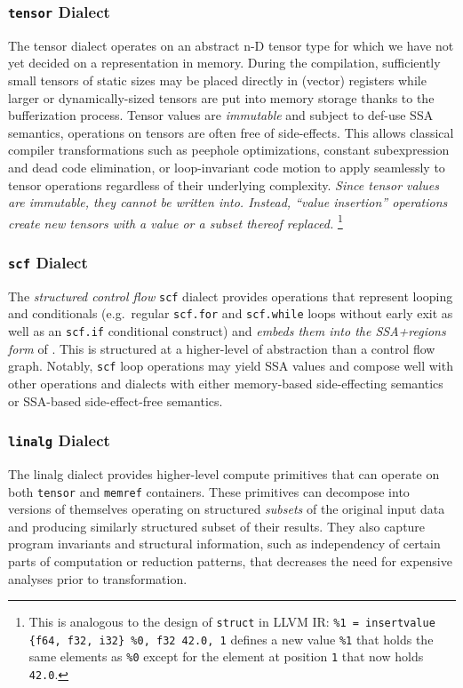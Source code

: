 \subsubsection{\lstinline|tensor| Dialect}
\label{subsubsec:tensor-dialect}
The tensor dialect operates on an abstract n-D tensor type for which we have not yet decided on a representation in memory. 
During the compilation, sufficiently small tensors of static sizes may be placed directly in (vector) registers while larger or dynamically-sized tensors are put into memory storage thanks to the bufferization process.
Tensor values are \emph{immutable} and subject to def-use SSA semantics, operations on tensors are often free of side-effects.
This allows classical compiler transformations such as peephole optimizations, constant subexpression and dead code elimination, or loop-invariant code motion to apply seamlessly to tensor operations regardless of their underlying complexity.
\emph{Since tensor values are immutable, they cannot be written into. Instead, ``value insertion'' operations create new tensors with a value or a subset thereof replaced.}
\footnote{This is analogous to the design of \texttt{struct} in LLVM IR:
\texttt{\%1 = insertvalue \{f64, f32, i32\} \%0, f32 42.0, 1} defines a new value \texttt{\%1} that holds the same elements as \texttt{\%0} except for the element at position \texttt{1} that now holds \texttt{42.0}.
}

\subsubsection{\lstinline|scf| Dialect}
The \emph{structured control flow} \lstinline|scf| dialect provides operations that represent looping and conditionals (e.g.\ regular \lstinline|scf.for| and \lstinline|scf.while| loops without early exit as well as an \lstinline|scf.if| conditional construct) and \emph{embeds them into the SSA+regions form} of \MLIR.
This is structured at a higher-level of abstraction than a control flow graph. Notably, \lstinline|scf| loop operations may yield SSA values and compose well with other operations and dialects with either memory-based side-effecting semantics or SSA-based side-effect-free semantics.

\subsubsection{\lstinline|linalg| Dialect}
The linalg dialect provides higher-level compute primitives that can operate on both \lstinline|tensor| and \lstinline|memref| containers. These primitives can decompose into versions of themselves operating on structured \emph{subsets} of the original input data and producing similarly structured subset of their results. They also capture program invariants and structural information, such as independency of certain parts of computation or reduction patterns, that decreases the need for expensive analyses prior to transformation.

